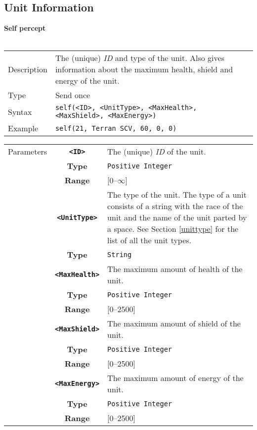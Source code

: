 \subsection{Unit Information}
\textbf{Self percept}\\
\\
\begin{tabularx}{\textwidth}{lX}
 Description & The (unique) \textit{ID} and type of the unit. Also gives information about the maximum health, shield and energy of the unit. \\
 Type & Send once \\
 Syntax & \verb|self(<ID>, <UnitType>, <MaxHealth>, <MaxShield>, <MaxEnergy>)| \\
 Example & \verb|self(21, Terran SCV, 60, 0, 0)|   \\
 \end{tabularx}
 \begin{tabularx}{\textwidth}{l | c | p{8cm}|}
 \cline{2-3}
 Parameters & \textbf{\verb|<ID>|} & The (unique) \textit{ID} of the unit.\\
            & \textbf{Type} & \verb|Positive Integer| \\
            & \textbf{Range} & [0--$\infty$] \\
            \cline{2-3}
            & \textbf{\verb|<UnitType>|} & The type of the unit. The type of a unit consists of a string with the race of the unit and the name of the unit parted by a space. See Section \ref{unittype} for the list of all the unit types. \\
            & \textbf{Type} & \verb|String| \\
            \cline{2-3}
            & \textbf{\verb|<MaxHealth>|} & The maximum amount of health of the unit.\\
            & \textbf{Type} & \verb|Positive Integer| \\
            & \textbf{Range} & [0--2500] \\
            \cline{2-3}
            & \textbf{\verb|<MaxShield>|} & The maximum amount of shield of the unit.\\
            & \textbf{Type} & \verb|Positive Integer| \\
            & \textbf{Range} & [0--2500] \\
            \cline{2-3}
            & \textbf{\verb|<MaxEnergy>|} & The maximum amount of energy of the unit.\\
            & \textbf{Type} & \verb|Positive Integer| \\
            & \textbf{Range} & [0--2500] \\
            \cline{2-3}
\end{tabularx}
